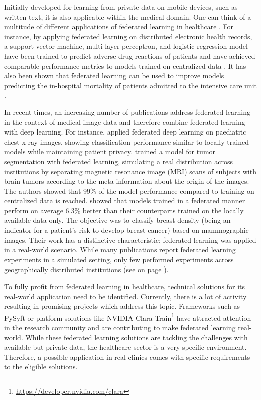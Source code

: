 Initially developed for learning from private data on mobile devices, such as written text, it is also applicable within the medical domain. One can think of a multitude of different applications of federated learning in healthcare \citep{Xu2021}. For instance, by applying federated learning on distributed electronic health records, a support vector machine, multi-layer perceptron, and logistic regression model have been trained to predict adverse drug reactions of patients and have achieved comparable performance metrics to models trained on centralized data \citep{Choudhury2019PredictingLearning}. It has also been shown that federated learning can be used to improve models predicting the in-hospital mortality of patients admitted to the intensive care unit \citep{Sharma2019PreservingMortality}.

In recent times, an increasing number of publications address federated learning in the context of medical image data and therefore combine federated learning with deep learning.
For instance, \cite{Kaissis2021End-to-endImaging} applied federated deep learning on paediatric chest x-ray images, showing classification performance similar to locally trained models while maintaining patient privacy.
\cite{Sheller2020FederatedData} trained a model for tumor segmentation with federated learning, simulating a real distribution across institutions by separating  magnetic resonance image (MRI) scans of subjects with brain tumors according to the meta-information about the origin of the images. The authors showed that 99\% of the model performance compared to training on centralized data is reached.
\cite{Roth2020FederatedImplementation} showed that models trained in a federated manner perform on average 6.3\% better than their counterparts trained on the locally available data only. The objective was to classify breast density (being an indicator for a patient's risk to develop breast cancer) based on mammographic images. Their work has a distinctive characteristic: federated learning was applied in a real-world scenario.
While many publications report federated learning experiments in a simulated setting, only few performed experiments across geographically distributed institutions (see  on page \pageref{subsec:LitRev}).

To fully profit from federated learning in healthcare, technical solutions for its real-world application need to be identified. Currently, there is a lot of activity resulting in promising projects which address this topic. Frameworks such as PySyft \citep{Ryffel2018ALearning} or platform solutions like NVIDIA Clara Train\footnote{\url{https://developer.nvidia.com/clara}} have attracted attention in the research community and are contributing to make federated learning real-world. While these federated learning solutions are tackling the challenges with available but private data, the healthcare sector is a very specific environment. Therefore, a possible application in real clinics comes with specific requirements to the eligible solutions.

